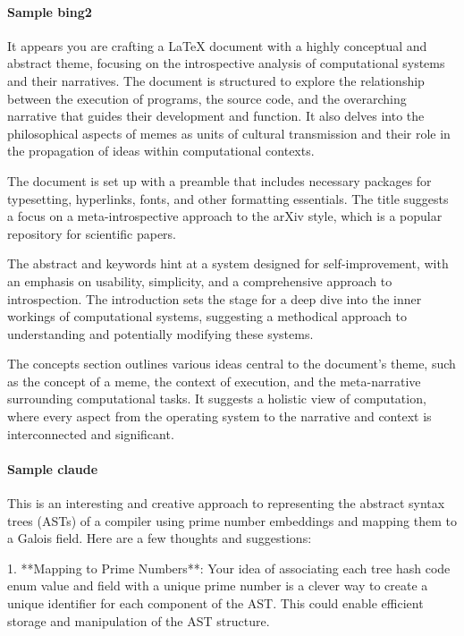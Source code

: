 \documentclass{article}
\begin{document}
\paragraph{Sample bing2}

It appears you are crafting a LaTeX document with a highly conceptual and abstract theme, focusing on the introspective analysis of computational systems and their narratives. The document is structured to explore the relationship between the execution of programs, the source code, and the overarching narrative that guides their development and function. It also delves into the philosophical aspects of memes as units of cultural transmission and their role in the propagation of ideas within computational contexts.

The document is set up with a preamble that includes necessary packages for typesetting, hyperlinks, fonts, and other formatting essentials. The title suggests a focus on a meta-introspective approach to the arXiv style, which is a popular repository for scientific papers.

The abstract and keywords hint at a system designed for self-improvement, with an emphasis on usability, simplicity, and a comprehensive approach to introspection. The introduction sets the stage for a deep dive into the inner workings of computational systems, suggesting a methodical approach to understanding and potentially modifying these systems.

The concepts section outlines various ideas central to the document's theme, such as the concept of a meme, the context of execution, and the meta-narrative surrounding computational tasks. It suggests a holistic view of computation, where every aspect from the operating system to the narrative and context is interconnected and significant.

\paragraph{Sample claude}

This is an interesting and creative approach to representing the abstract syntax trees (ASTs) of a compiler using prime number embeddings and mapping them to a Galois field. Here are a few thoughts and suggestions:

1. **Mapping to Prime Numbers**: Your idea of associating each tree hash code enum value and field with a unique prime number is a clever way to create a unique identifier for each component of the AST. This could enable efficient storage and manipulation of the AST structure.
\end{document}
